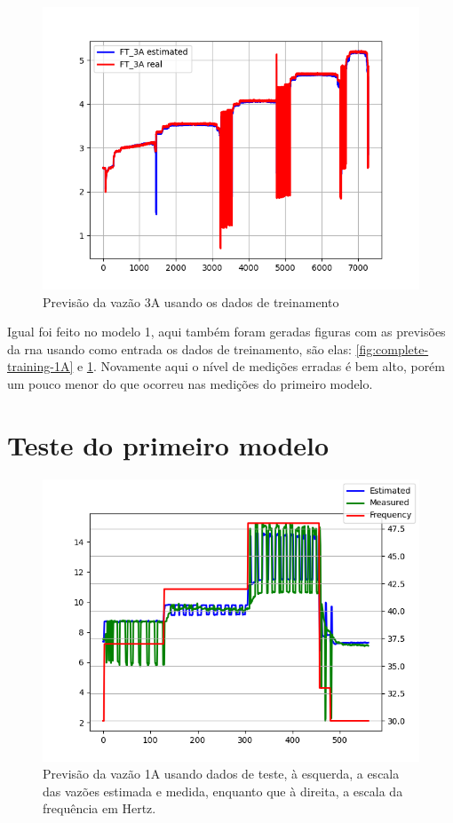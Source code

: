 \documentclass[12pt]{article}
\begin{document}
\begin{figure}
    \centering
    \includegraphics{results/complete-training-3A.png}
    \caption{Previsão da vazão 3A usando os dados de treinamento}
    \label{fig:complete-training-3A}
\end{figure}

Igual foi feito no modelo 1, aqui também foram geradas figuras com as previsões da \acrshort{rna} usando como entrada os dados de treinamento, são elas: \ref{fig:complete-training-1A} e \ref{fig:complete-training-3A}.
Novamente aqui o nível de medições erradas é bem alto, porém um pouco menor do que ocorreu nas medições do primeiro modelo.

\section{Teste do primeiro modelo}



\begin{figure}
    \centering
    \includegraphics{results/initial-test-1A.png}
    \caption{Previsão da vazão 1A usando dados de teste, à esquerda, a escala das vazões estimada e medida, enquanto que à direita, a escala da frequência em Hertz.}
    \label{fig:initial-test-1A}
\end{figure}
\end{document}
